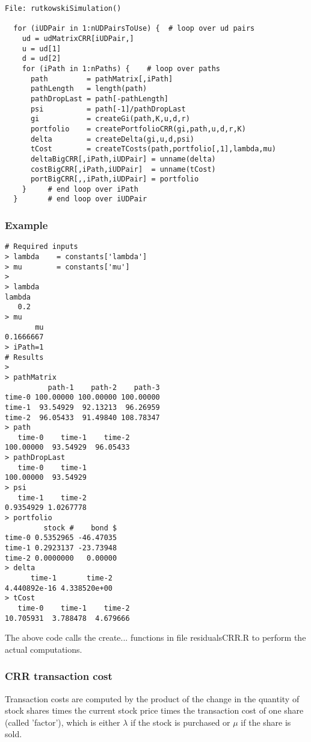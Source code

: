 \documentclass[10pt]{article}
\begin{document}
\begin{verbatim}
File: rutkowskiSimulation()

  for (iUDPair in 1:nUDPairsToUse) {  # loop over ud pairs
    ud = udMatrixCRR[iUDPair,]
    u = ud[1]
    d = ud[2]
    for (iPath in 1:nPaths) {    # loop over paths
      path         = pathMatrix[,iPath]
      pathLength   = length(path)
      pathDropLast = path[-pathLength]
      psi          = path[-1]/pathDropLast
      gi           = createGi(path,K,u,d,r)
      portfolio    = createPortfolioCRR(gi,path,u,d,r,K)
      delta        = createDelta(gi,u,d,psi)
      tCost        = createTCosts(path,portfolio[,1],lambda,mu)
      deltaBigCRR[,iPath,iUDPair] = unname(delta)
      costBigCRR[,iPath,iUDPair]  = unname(tCost)
      portBigCRR[,,iPath,iUDPair] = portfolio
    }     # end loop over iPath
  }       # end loop over iUDPair
\end{verbatim}

\subsubsection*{Example}

\begin{verbatim}
# Required inputs
> lambda    = constants['lambda']
> mu        = constants['mu']
>
> lambda
lambda
   0.2
> mu
       mu
0.1666667
> iPath=1
# Results
>
> pathMatrix
          path-1    path-2    path-3
time-0 100.00000 100.00000 100.00000
time-1  93.54929  92.13213  96.26959
time-2  96.05433  91.49840 108.78347
> path
   time-0    time-1    time-2
100.00000  93.54929  96.05433
> pathDropLast
   time-0    time-1
100.00000  93.54929
> psi
   time-1    time-2
0.9354929 1.0267778
> portfolio
         stock #    bond $
time-0 0.5352965 -46.47035
time-1 0.2923137 -23.73948
time-2 0.0000000   0.00000
> delta
      time-1       time-2
4.440892e-16 4.338520e+00
> tCost
   time-0    time-1    time-2
10.705931  3.788478  4.679666
\end{verbatim}


The above code calls the create... functions in file residualsCRR.R to
perform the actual computations.

\subsubsection*{CRR  transaction cost}

Transaction costs are computed by the product of the change in the
quantity of stock shares times the current stock price times the
transaction cost of one share (called 'factor'), which is either $\lambda$ if the stock
is purchased or $\mu$ if the share is sold.
\end{document}
